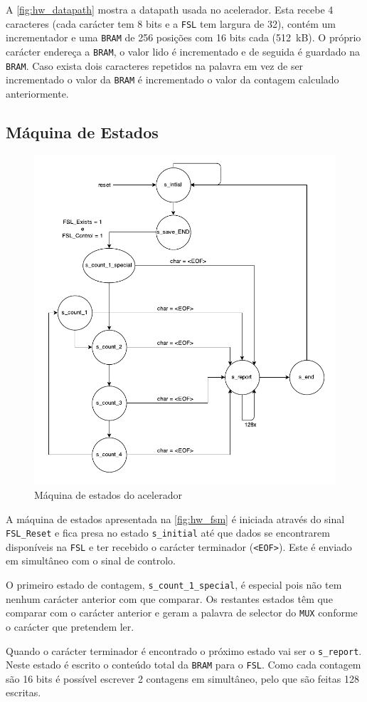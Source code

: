   A \autoref{fig:hw_datapath} mostra a datapath usada no acelerador. Esta recebe 4 caracteres (cada carácter tem 8 bits e a \texttt{FSL} tem largura de 32), contém um incrementador e uma \texttt{BRAM} de 256 posições com 16 bits cada (512~kB). O próprio carácter endereça a \texttt{BRAM}, o valor lido é incrementado e de seguida é guardado na \texttt{BRAM}. Caso exista dois caracteres repetidos na palavra em vez de ser incrementado o valor da \texttt{BRAM} é incrementado o valor da contagem calculado anteriormente.

\subsection{Máquina de Estados}
  \begin{figure}[h]
    \centering
    \includegraphics[width=1.\textwidth]{img/fsm}
    \caption{Máquina de estados do acelerador}
    \label{fig:hw_fsm}
  \end{figure}

  A máquina de estados apresentada na \autoref{fig:hw_fsm} é iniciada através do sinal \texttt{FSL\_Reset} e fica presa no estado \texttt{s\_initial} até que dados se encontrarem disponíveis na \texttt{FSL} e ter recebido o carácter terminador (\texttt{<EOF>}). Este é enviado em simultâneo com o sinal de controlo.

  O primeiro estado de contagem, \texttt{s\_count\_1\_special}, é especial pois não tem nenhum carácter anterior com que comparar. Os restantes estados têm que comparar com o carácter anterior e geram a palavra de selector do \texttt{MUX} conforme o carácter que pretendem ler.

  Quando o carácter terminador é encontrado o próximo estado vai ser o \texttt{s\_report}. Neste estado é escrito o conteúdo total da \texttt{BRAM} para o \texttt{FSL}. Como cada contagem são 16 bits é possível escrever 2 contagens em simultâneo, pelo que são feitas 128 escritas.
